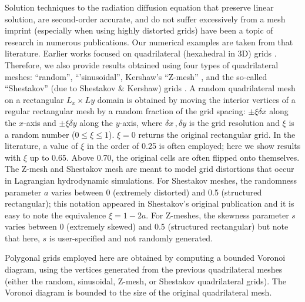 \documentclass[preprint,10pt]{elsarticle}
\begin{document}
Solution techniques to the radiation diffusion equation that preserve linear solution, are 
second-order accurate, and do not suffer excessively from a mesh imprint (especially when using highly
distorted grids) have been a topic of research in numerous publications. Our numerical examples
are taken from that literature. Earlier works focused on quadrilateral (hexahedral in 3D) grids
\cite{aaa}. Therefore, we also provide results obtained using four types of quadrilateral meshes: 
``random'', ``'sinusoidal'', Kershaw's ``Z-mesh'' \cite{Kershaw1981}, and the so-called ``Shestakov''
(due to Shestakov \& Kershaw) grids \cite{Shestakov1988,Sheshakov1990}.
A random quadrilateral mesh on a rectangular $L_x \times Ly$ domain is obtained by moving the interior 
vertices of a regular rectangular mesh by a random fraction of the grid spacing: $\pm\xi\delta x$ along 
the $x$-axis and $\pm\xi\delta y$ along the $y$-axis, where $\delta x\,,\delta y$ is the grid resolution 
and $\xi$ is a random number ($0 \le \xi \le 1$). $\xi=0$ returns the original rectangular grid. In 
the literature, a value of $\xi$ in the order of 0.25 is often employed; here we show results with $\xi$ up to 0.65. 
Above 0.70, the original cells are often flipped onto themselves. The Z-mesh and Shestakov 
mesh are meant to model grid distortions that occur in Lagrangian hydrodynamic simulations. 
For Shestakov meshes, the randomness parameter $a$ varies between 0 (extremely distorted) 
and 0.5 (structured rectangular); this notation appeared in Shestakov's original publication and it is 
easy to note the equivalence $\xi = 1-2a$.
For Z-meshes, the skewness parameter $s$ varies between 0 (extremely skewed) and 0.5 (structured rectangular)
but note that here, $s$ is user-specified and not randomly generated.

Polygonal grids employed here are obtained by computing a bounded Voronoi diagram, using the 
vertices generated from the previous quadrilateral meshes (either the random, sinusoidal, Z-mesh, 
or Shestakov quadrilateral grids). The Voronoi diagram is bounded to the size of the original 
quadrilateral mesh.


\end{document}

